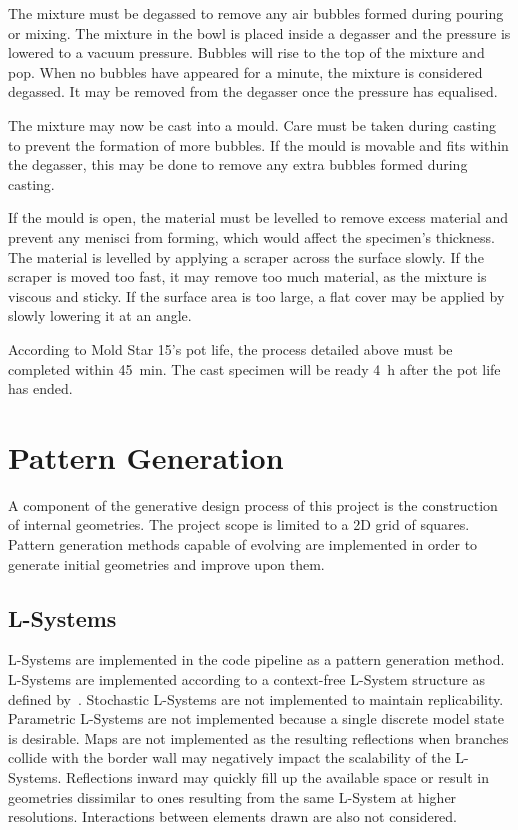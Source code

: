 The mixture must be degassed to remove any air bubbles formed during pouring or mixing. The mixture in the bowl is placed inside a degasser and the pressure is lowered to a vacuum pressure. Bubbles will rise to the top of the mixture and pop. When no bubbles have appeared for a minute, the mixture is considered degassed. It may be removed from the degasser once the pressure has equalised.

The mixture may now be cast into a mould. Care must be taken during casting to prevent the formation of more bubbles. If the mould is movable and fits within the degasser, this may be done to remove any extra bubbles formed during casting.

If the mould is open, the material must be levelled to remove excess material and prevent any menisci from forming, which would affect the specimen's thickness. The material is levelled by applying a scraper across the surface slowly. If the scraper is moved too fast, it may remove too much material, as the mixture is viscous and sticky. If the surface area is too large, a flat cover may be applied by slowly lowering it at an angle.

According to Mold Star 15's pot life, the process detailed above must be completed within \SI{45}{\minute}. The cast specimen will be ready \SI{4}{\hour} after the pot life has ended.

\section{Pattern Generation}

A component of the generative design process of this project is the construction of internal geometries. The project scope is limited to a 2D grid of squares. Pattern generation methods capable of evolving are implemented in order to generate initial geometries and improve upon them.

\subsection{L-Systems}
\label{ssec:LS}

L-Systems are implemented in the code pipeline as a pattern generation method. L-Systems are implemented according to a context-free L-System structure as defined by~\cite{Prusinkiewicz2004}. Stochastic L-Systems are not implemented to maintain replicability. Parametric L-Systems are not implemented because a single discrete model state is desirable. Maps are not implemented as the resulting reflections when branches collide with the border wall may negatively impact the scalability of the L-Systems. Reflections inward may quickly fill up the available space or result in geometries dissimilar to ones resulting from the same L-System at higher resolutions. Interactions between elements drawn are also not considered.

